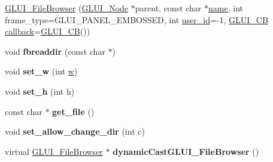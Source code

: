 \begin{DoxyCompactItemize}
\item 
\hyperlink{class_g_l_u_i___file_browser_ace9c0db8913e7e5ecc72a859746e0d45}{G\+L\+U\+I\+\_\+\+File\+Browser} (\hyperlink{class_g_l_u_i___node}{G\+L\+U\+I\+\_\+\+Node} $\ast$parent, const char $\ast$\hyperlink{class_g_l_u_i___control_aa95b97d50df45335fc33f0af03958eb3}{name}, int frame\+\_\+type=G\+L\+U\+I\+\_\+\+P\+A\+N\+E\+L\+\_\+\+E\+M\+B\+O\+S\+S\+E\+D, int \hyperlink{class_g_l_u_i___control_a6c88b7c72b0800f88a5d4cda4868c8b6}{user\+\_\+id}=-\/1, \hyperlink{class_g_l_u_i___c_b}{G\+L\+U\+I\+\_\+\+C\+B} \hyperlink{class_g_l_u_i___control_a96060fe0cc6d537e736dd6eef78e24ab}{callback}=\hyperlink{class_g_l_u_i___c_b}{G\+L\+U\+I\+\_\+\+C\+B}())
\item 
\hypertarget{class_g_l_u_i___file_browser_a76b3f6caf8832c0972d8b38c0f77e535}{void {\bfseries fbreaddir} (const char $\ast$)}\label{class_g_l_u_i___file_browser_a76b3f6caf8832c0972d8b38c0f77e535}

\item 
\hypertarget{class_g_l_u_i___file_browser_a03e1e54808847b5e7461d27826cf7827}{void {\bfseries set\+\_\+w} (int \hyperlink{class_g_l_u_i___control_aca82a099b9cbbadb188794cbfb06aa27}{w})}\label{class_g_l_u_i___file_browser_a03e1e54808847b5e7461d27826cf7827}

\item 
\hypertarget{class_g_l_u_i___file_browser_a41b68f6bf7e87c25236a6a7ae78ee98b}{void {\bfseries set\+\_\+h} (int h)}\label{class_g_l_u_i___file_browser_a41b68f6bf7e87c25236a6a7ae78ee98b}

\item 
\hypertarget{class_g_l_u_i___file_browser_a671f6f7608f38f48d07f7739e1efcad3}{const char $\ast$ {\bfseries get\+\_\+file} ()}\label{class_g_l_u_i___file_browser_a671f6f7608f38f48d07f7739e1efcad3}

\item 
\hypertarget{class_g_l_u_i___file_browser_a5395fc694e33fab6cd3a0546b6899292}{void {\bfseries set\+\_\+allow\+\_\+change\+\_\+dir} (int c)}\label{class_g_l_u_i___file_browser_a5395fc694e33fab6cd3a0546b6899292}

\item 
\hypertarget{class_g_l_u_i___file_browser_a890aa009d37fbf18cc0f2b4447e853fd}{virtual \hyperlink{class_g_l_u_i___file_browser}{G\+L\+U\+I\+\_\+\+File\+Browser} $\ast$ {\bfseries dynamic\+Cast\+G\+L\+U\+I\+\_\+\+File\+Browser} ()}\label{class_g_l_u_i___file_browser_a890aa009d37fbf18cc0f2b4447e853fd}

\end{DoxyCompactItemize}
